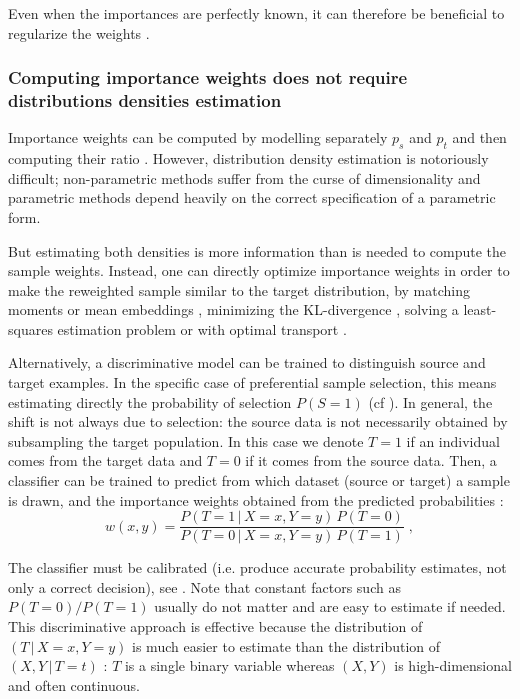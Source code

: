 \documentclass[a4paper,num-refs]{oup-contemporary}
\newcommand{\giv}{ \,|\, }
\begin{document}
Even when the importances are perfectly known, it can therefore be beneficial to
regularize the weights \citep{shimodaira2000improving}.

\subsubsection{Computing importance weights does not require distributions
  densities estimation}\label{sec:no-density-estimation}

Importance weights can be computed by modelling separately \(p_s\) and \(p_t\)
and then computing their ratio \citep[Sec. 4.1]{sugiyama2012machine}.
%
However, distribution density estimation is notoriously difficult; non-parametric methods
suffer from the curse of dimensionality and parametric methods depend heavily on
the correct specification of a parametric form.
%

But estimating both densities is more information than is needed to compute
the sample weights.
%
Instead, one can directly optimize importance weights in order to make the
reweighted sample similar to the target distribution, by matching moments
\citep{sun2016return} or mean embeddings
\citep{huang2007correcting,zhang2013domain}, minimizing the KL-divergence
\citep{sugiyama2008direct}, solving a least-squares estimation problem
\citep{kanamori2009least} or with optimal transport \citep{courty2016optimal}.
%

Alternatively, a discriminative model can be trained to distinguish source and target
examples. In the specific case of preferential sample selection, this means estimating
directly the probability of selection \(P(S=1)\) (cf
).
%
In general, the shift is not always due to selection: the source data is not
necessarily obtained by subsampling the target population. In this case we
denote \(T = 1\) if an individual comes from the target data and \(T = 0\) if it
comes from the source data.
%
Then, a classifier can be trained to predict from which dataset (source
or target) a sample is drawn, and the importance weights obtained from the
predicted probabilities \citep[Sec. 4.3]{sugiyama2012machine}:
%
\begin{equation}
  w(x, y) = \frac{P(T=1 \giv X=x, Y=y)\,P(T=0)}{P(T=0 \giv X=x, Y=y)\,P(T=1)} \;,
\end{equation}

%
The classifier must be calibrated (i.e. produce accurate
probability estimates, not only a correct decision), see
\citet{niculescu2005predicting}.
%
Note that constant factors such as \(P(T=0) / P(T=1)\) usually do not matter and are easy
to estimate if needed.
%
This discriminative approach is effective because the distribution of \((T \giv
X=x, Y=y)\) is much easier to estimate than the distribution of \((X, Y \giv
T=t)\) : \(T\) is a single binary variable whereas \((X, Y)\) is
high-dimensional and often continuous.
%
\end{document}
